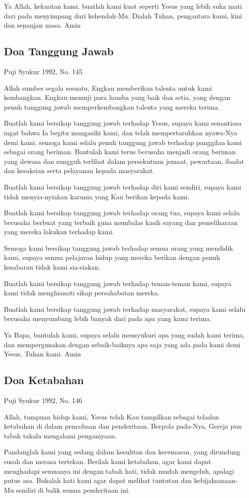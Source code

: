 \documentclass[titlepage,11pt,openany]{scrbook}
\newcommand{\ps}[2][\numexpr\value{subsection}+1\relax]{%
\setcounter{subsection}{\numexpr#1-1\relax}
\subsection{#2}
}
\begin{document}
Ya Allah, kekuatan kami, buatlah kami kuat seperti Yesus yang lebih suka mati dari pada menyimpang dari kehendak-Mu. Dialah Tuhan, pengantara kami, kini dan sepanjan masa. Amin

 

\ps{Doa Tanggung Jawab}
Puji Syukur 1992, No. 145

Allah sumber segala sesuatu, Engkau memberikan talenta untuk kami kembangkan. Engkau memuji para hamba yang baik dan setia, yang dengan penuh tanggung jawab memperkembangkan talenta yang mereka terima.

Buatlah kami bersikap tanggung jawab terhadap Yesus, supaya kami senantiasa ingat bahwa Ia begitu mangasihi kami, dan telah mempertaruhkan nyawa-Nya demi kami. semoga kami selalu penuh tanggung jawab terhadap panggilan kami sebagai orang beriman. Bantulah kami terus berusaha menjadi orang beriman yang dewasa dan sungguh terlibat dalam persekutuan jemaat, pewartaan, ibadat dan kesaksian serta pelayanan kepada masyarakat.

Buatlah kami bersikap tanggung jawab terhadap diri kami sendiri, supaya kami tidak menyia-nyiakan karunia yang Kau berikan kepada kami.

Buatlah kami bersikap tanggung jawab terhadap orang tua, supaya kami selalu berusaha berbuat yang terbaik guna membalas kasih sayang dan pemeliharaan yang mereka lakukan terhadap kami.

Semoga kami bersikap tanggung jawab terhadap semua orang yang mendidik kami, supaya semua pelajaran hidup yang mereka berikan dengan penuh kesabaran tidak kami sia-siakan.

Buatlah kami bersikap tanggung jawab terhadap teman-teman kami, supaya kami tidak menghianati sikap persahabatan mereka.

Buatlah kami bersikap tanggung jawab terhadap masyarakat, supaya kami selalu berusaha menyumbang lebih banyak dari pada apa yang kami terima.

Ya Bapa, bantulah kami, supaya selalu mensyukuri apa yang sudah kami terima, dan mempergunakan dengan sebaik-baiknya apa saja yang ada pada kami demi Yesus, Tuhan kami. Amin

 

\ps{Doa Ketabahan}
Puji Syukur 1992, No. 146

Allah, tumpuan hidup kami, Yesus telah Kau tampilkan sebagai teladan ketabahan di dalam pencobaan dan penderitaan. Berpola pada-Nya, Gereja pun tabah takala mengalami penganiyaan.

Pandanglah kami yang sedang dalam kesulitan dan kecemasan, yang dirundung susah dan merasa tertekan. Berilah kami ketabahan, agar kami dapat menghadapi semuanya ini dengan tabah hati, tidak mudah mengeluh, apalagi putus asa. Bukalah hati kami agar dapat melihat tuntutan dan kebijaksanaan-Mu sendiri di balik semua penderitaan ini.
\end{document}
